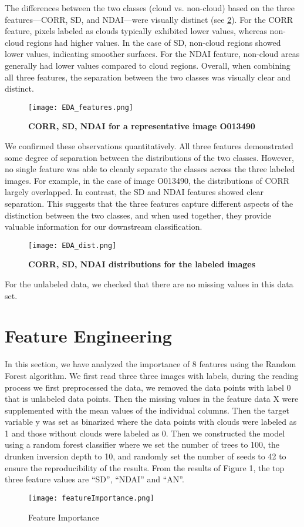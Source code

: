 \documentclass[10pt,letterpaper]{article}
\begin{document}
The differences between the two classes (cloud vs. non-cloud) based on the three features—CORR, SD, and NDAI—were visually distinct (see \ref{fig:fig3}). For the CORR feature, pixels labeled as clouds typically exhibited lower values, whereas non-cloud regions had higher values. In the case of SD, non-cloud regions showed lower values, indicating smoother surfaces. For the NDAI feature, non-cloud areas generally had lower values compared to cloud regions. Overall, when combining all three features, the separation between the two classes was visually clear and distinct.
\begin{figure}[H] 
    \centering
    \texttt{[image: EDA\_features.png]}  %
    \caption{\textbf{CORR, SD, NDAI for a representative image O013490}}
    \label{fig:fig3}
\end{figure}

We confirmed these observations quantitatively. All three features demonstrated some degree of separation between the distributions of the two classes. However, no single feature was able to cleanly separate the classes across the three labeled images. For example, in the case of image O013490, the distributions of CORR largely overlapped. In contrast, the SD and NDAI features showed clear separation. This suggests that the three features capture different aspects of the distinction between the two classes, and when used together, they provide valuable information for our downstream classification.
\begin{figure}[H] 
    \centering
    \texttt{[image: EDA\_dist.png]}  %
    \caption{\textbf{CORR, SD, NDAI distributions for the labeled images}}
    \label{fig:fig3}
\end{figure}

For the unlabeled data, we checked that there are no missing values in this data set. 

\section{Feature Engineering}

In this section, we have analyzed the importance of 8 features using the Random Forest algorithm. We first read three three images with labels, during the reading process we first preprocessed the data, we removed the data points with label 0 that is unlabeled data points. Then the missing values in the feature data X were supplemented with the mean values of the individual columns. Then the target variable y was set as binarized where the data points with clouds were labeled as 1 and those without clouds were labeled as 0. Then we constructed the model using a random forest classifier where we set the number of trees to 100, the drunken inversion depth to 10, and randomly set the number of seeds to 42 to ensure the reproducibility of the results. From the results of Figure 1, the top three feature values are “SD”, “NDAI” and “AN”.
\begin{figure}[H]
    \centering
    \texttt{[image: featureImportance.png]}
    \caption{Feature Importance}
    \label{fig:enter-label}
\end{figure}
\end{document}
